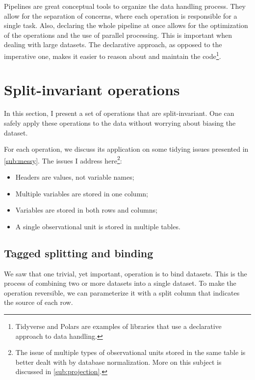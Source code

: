 Pipelines are great conceptual tools to organize the data handling process.  They allow
for the separation of concerns, where each operation is responsible for a single task.
Also, declaring the whole pipeline at once allows for the optimization of the operations
and the use of parallel processing.  This is important when dealing with large datasets.
The declarative approach, as opposed to the imperative one, makes it easier to reason about
and maintain the code\footnote{Tidyverse and Polars are examples of
libraries that use a declarative approach to data handling.}.

\section{Split-invariant operations}
\label{sec:split-invariant-ops}

In this section, I present a set of operations that are split-invariant.  One can safely
apply these operations to the data without worrying about biasing the dataset.

For each operation, we discuss its application on some tidying issues presented in
\cref{sub:messy}.  The issues I address here\footnote{%
The issue of multiple types of observational units stored in the same table is better
dealt with by database normalization.  More on this subject is discussed in
\cref{sub:projection}.}:
\begin{itemize}
  \itemsep0em
  \item Headers are values, not variable names;
  \item Multiple variables are stored in one column; %
  \item Variables are stored in both rows and columns;
  \item A single observational unit is stored in multiple tables.
\end{itemize}



\subsection{Tagged splitting and binding}

We saw that one trivial, yet important, operation is to bind datasets.  This is the
process of combining two or more datasets into a single dataset.  To make the
operation reversible, we can parameterize it with a split column that indicates the source
of each row.

